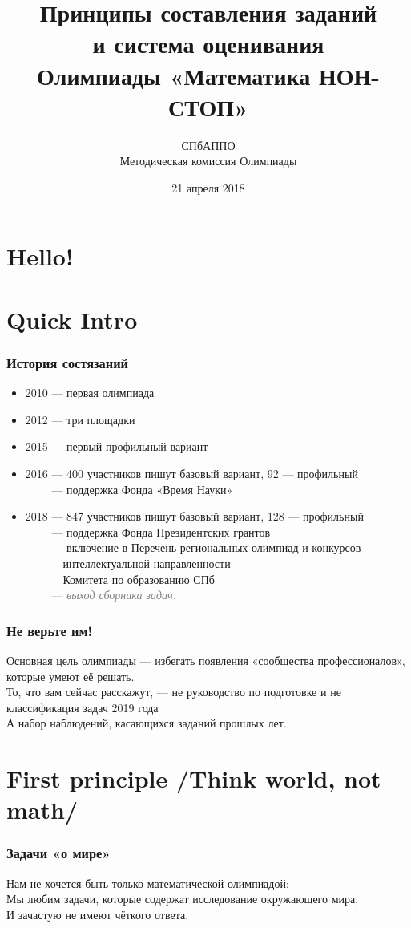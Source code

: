 \documentclass[aspectratio=1610,12pt]{beamer}
\title[Математика НОН-СТОП $\mid$ Семинар]
	{\bfseries Принципы составления заданий \\
		и система оценивания \\
		Олимпиады «Математика НОН-СТОП»}
\author[Б.А.\,Золотов, Д.Г.\,Штукенберг]
	{СПбАППО \\ \vspace{0.3cm} Методическая комиссия Олимпиады}
\institute[\textcolor{white}{«Время науки», ЛНМО, СПбАППО}]{}
\date{21 апреля 2018}
\def\fram#1#2{\begin{frame}\frametitle{\bf #1}#2\end{frame}}
\def\scolon{\rlap{,}\raisebox{0.8ex}{,} }
\def\mitem{\medskip\item}
\def\ps{\\ [0.8cm]}
\def\mitem{\medskip\item}
\begin{document}
\section[Приветствие]{Hello!}
\begin{frame}\titlepage\end{frame}

\section[Введение]{Quick Intro}

\fram{История состязаний}{
\begin{itemize}
	\item 2010 — первая олимпиада\scolon
	\mitem 2012 — три площадки\scolon
	\mitem 2015 — первый профильный вариант\scolon
	\mitem 2016 — 400 участников пишут базовый вариант, 92 --- профильный\scolon\\
        $\phantom{2016}$ — поддержка Фонда «Время Науки»\scolon
	\mitem 2018 — 847 участников пишут базовый вариант, 128 --- профильный\scolon\\
	$\phantom{2018}$ — поддержка Фонда Президентских грантов\scolon\\
        $\phantom{2018}$ — включение в Перечень региональных олимпиад и конкурсов\\
	$\phantom{2018 — }$ интеллектуальной направленности \\
	$\phantom{2018 — }$ Комитета по образованию СПб\scolon\\
	$\phantom{2018}$ \textcolor{gray}{— {\itshape выход сборника задач.}}
\end{itemize}}

\fram{Не верьте им!}{
	Основная цель олимпиады — избегать появления «сообщества профессионалов», которые умеют её решать. \ps
	То, что вам сейчас расскажут, — не руководство по подготовке и не классификация задач 2019 года\scolon \ps
	А набор наблюдений, касающихся заданий прошлых лет.
}

\section[1]{First principle /Think world, not math/}
\fram{Задачи «о мире»}{
	Нам не хочется быть только математической олимпиадой: \ps
	Мы любим задачи, которые содержат исследование окружающего мира, \ps
	И зачастую не имеют чёткого ответа.
}
\end{document}
